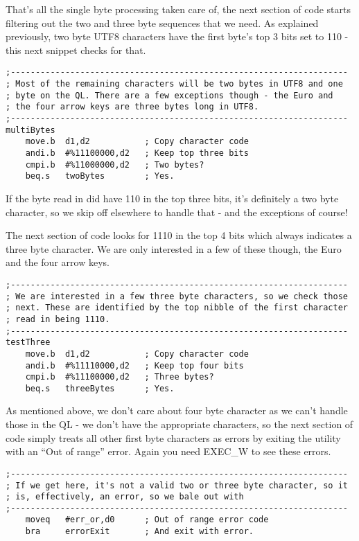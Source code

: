 That's all the single byte processing taken care of, the next section
of code starts filtering out the two and three byte sequences that
we need. As explained previously, two byte UTF8 characters have the
first byte's top 3 bits set to 110 - this next snippet checks for
that.

\begin{lstlisting}[firstnumber=last,caption={Utf82Ql: Testing for two byte UTF characters}]
;--------------------------------------------------------------------
; Most of the remaining characters will be two bytes in UTF8 and one
; byte on the QL. There are a few exceptions though - the Euro and 
; the four arrow keys are three bytes long in UTF8.
;--------------------------------------------------------------------
multiBytes
    move.b  d1,d2           ; Copy character code
    andi.b  #%11100000,d2   ; Keep top three bits
    cmpi.b  #%11000000,d2   ; Two bytes?
    beq.s   twoBytes        ; Yes.
\end{lstlisting}

If the byte read in did have 110 in the top three bits, it's definitely
a two byte character, so we skip off elsewhere to handle that - and
the exceptions of course!

The next section of code looks for 1110 in the top 4 bits which always
indicates a three byte character. We are only interested in a few
of these though, the Euro and the four arrow keys.

\begin{lstlisting}[firstnumber=last,caption={Utf82Ql: Testing for three byte UTF characters}]
;--------------------------------------------------------------------
; We are interested in a few three byte characters, so we check those
; next. These are identified by the top nibble of the first character
; read in being 1110.
;--------------------------------------------------------------------
testThree
    move.b  d1,d2           ; Copy character code
    andi.b  #%11110000,d2   ; Keep top four bits
    cmpi.b  #%11100000,d2   ; Three bytes?
    beq.s   threeBytes      ; Yes.
\end{lstlisting}

As mentioned above, we don't care about four byte character as we
can't handle those in the QL - we don't have the appropriate characters,
so the next section of code simply treats all other first byte characters
as errors by exiting the utility with an ``Out of range'' error.
Again you need EXEC\_W to see these errors.

\begin{lstlisting}[firstnumber=last,caption={Utf82Ql: Error out on UTF8 four byte characters}]
;--------------------------------------------------------------------
; If we get here, it's not a valid two or three byte character, so it 
; is, effectively, an error, so we bale out with 
;--------------------------------------------------------------------
    moveq   #err_or,d0      ; Out of range error code
    bra     errorExit       ; And exit with error.
\end{lstlisting}

